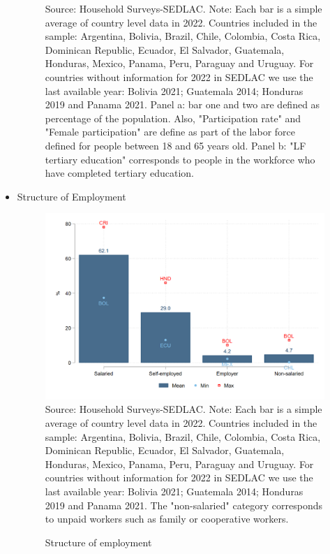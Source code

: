 \documentclass[english]{article}
\begin{document}
\begin{itemize}
\begin{figure}[!htb]
\footnotesize{Source: Household Surveys-SEDLAC.}
\footnotesize{Note: Each bar is a simple average of country level data in 2022. Countries included in the sample: Argentina, Bolivia, Brazil, Chile, Colombia, Costa Rica, Dominican Republic, Ecuador, El Salvador, Guatemala, Honduras, Mexico, Panama, Peru, Paraguay and Uruguay. For countries without information for 2022 in SEDLAC we use the last available year: Bolivia 2021; Guatemala 2014; Honduras 2019 and Panama 2021. Panel a: bar one and two are defined as percentage of the population. Also, "Participation rate" and "Female participation" are define as part of the labor force defined for people between 18 and 65 years old. Panel b: "LF tertiary education" corresponds to people in the workforce who have completed tertiary education.}

\end{figure}
  
    \item Structure of Employment
    
        \begin{figure}[!htb]
        \justifying
        \caption{Structure of employment}     
        \includegraphics[scale=.3]{latex/figures/Snapshot/Structure of employment.png}
        \label{fig:employment}
        \footnotesize{Source: Household Surveys-SEDLAC.}
        \footnotesize{Note: Each bar is a simple average of country level data in 2022. Countries included in the sample: Argentina, Bolivia, Brazil, Chile, Colombia, Costa Rica, Dominican Republic, Ecuador, El Salvador, Guatemala, Honduras, Mexico, Panama, Peru, Paraguay and Uruguay. For countries without information for 2022 in SEDLAC we use the last available year: Bolivia 2021; Guatemala 2014; Honduras 2019 and Panama 2021. The "non-salaried" category corresponds to unpaid workers such as family or cooperative workers.}
        \end{figure}



\end{itemize}
\end{document}
